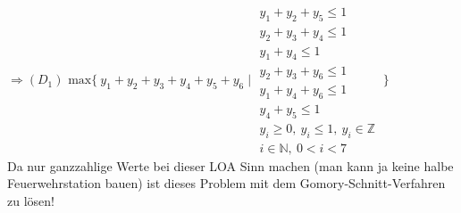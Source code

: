\documentclass[a4paper,10pt]{article}
\begin{document}
	$ \Longrightarrow (D_1) \text{ max} \{\ y_1+y_2+y_3+y_4+y_5+y_6 \mid 
	\begin{matrix}
		y_1 + y_2 + y_5 \leq 1\\
		y_2 + y_3 + y_4 \leq 1\\
		y_1 + y_4 \leq 1\\
		y_2 + y_3 + y_6 \leq 1\\
		y_1 + y_4 + y_6 \leq 1\\
		y_4 + y_5 \leq 1 \\
		y_i \geq 0, \ y_i \leq 1, \ y_i \in \mathbb{Z}\\
		i\in \mathbb{N}, \ 0 < i < 7
	\end{matrix}
	\ \}$\\
	
	Da nur ganzzahlige Werte bei dieser LOA Sinn machen (man kann ja keine halbe Feuerwehrstation bauen) ist dieses Problem mit dem Gomory-Schnitt-Verfahren zu lösen!
\end{document}
